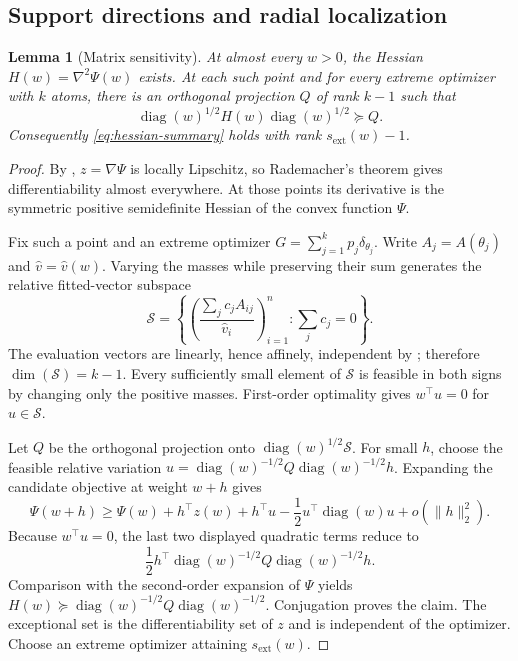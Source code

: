 \documentclass[11pt]{article}
\newtheorem{lemma}[theorem]{Lemma}
\theoremstyle{definition}
\theoremstyle{remark}
\DeclareMathOperator{\diag}{diag}
\newcommand{\norm}[1]{\lVert #1\rVert}
\newcommand{\vhat}{\widehat v}
\begin{document}
\subsection{Support directions and radial localization}

\begin{lemma}[Matrix sensitivity]
\label{lem:matrix-sensitivity}
At almost every $w>0$, the Hessian $H(w)=\nabla^2\Psi(w)$ exists.  At each
such point and for every extreme optimizer with $k$ atoms, there is an
orthogonal projection $Q$ of rank $k-1$ such that
\[
 \diag(w)^{1/2}H(w)\diag(w)^{1/2}\succeq Q.
\]
Consequently \eqref{eq:hessian-summary} holds with rank
$s_{\mathrm{ext}}(w)-1$.
\end{lemma}

\begin{proof}
By , $z=\nabla\Psi$ is locally Lipschitz, so Rademacher's
theorem gives differentiability almost everywhere.  At those points its
derivative is the symmetric positive semidefinite Hessian of the convex
function $\Psi$.

Fix such a point and an extreme optimizer
$G=\sum_{j=1}^kp_j\delta_{\theta_j}$.  Write
$A_j=A(\theta_j)$ and $\widehat v=\vhat(w)$.  Varying the masses while
preserving their sum generates the relative fitted-vector subspace
\[
 \mathcal S=\left\{
 \left(\frac{\sum_jc_jA_{ij}}{\widehat v_i}\right)_{i=1}^n:
 \sum_jc_j=0\right\}.
\]
The evaluation vectors are linearly, hence affinely, independent by
; therefore $\dim(\mathcal S)=k-1$.  Every sufficiently
small element of $\mathcal S$ is feasible in both signs by changing only the
positive masses.  First-order optimality gives $w^\top u=0$ for
$u\in\mathcal S$.

Let $Q$ be the orthogonal projection onto
$\diag(w)^{1/2}\mathcal S$.  For small $h$, choose the feasible relative
variation
$u=\diag(w)^{-1/2}Q\diag(w)^{-1/2}h$.  Expanding the candidate objective at
weight $w+h$ gives
\[
 \Psi(w+h)\ge\Psi(w)+h^\top z(w)
 +h^\top u-\frac12u^\top\diag(w)u+o(\norm{h}_2^2).
\]
Because $w^\top u=0$, the last two displayed quadratic terms reduce to
\[
 \frac12h^\top\diag(w)^{-1/2}Q\diag(w)^{-1/2}h.
\]
Comparison with the second-order expansion of $\Psi$ yields
$H(w)\succeq\diag(w)^{-1/2}Q\diag(w)^{-1/2}$.  Conjugation proves the claim.
The exceptional set is the differentiability set of $z$ and is independent
of the optimizer.  Choose an extreme optimizer attaining
$s_{\mathrm{ext}}(w)$.
\end{proof}
\end{document}
